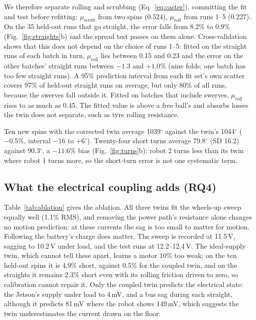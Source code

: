 \documentclass[conference,a4paper]{IEEEtran}
\begin{document}
We therefore separate rolling and scrubbing (Eq.~\ref{eq:caster}), committing
the fit and test before refitting: $\mu_\text{scrub}$ from two spins (0.524),
$\mu_\text{roll}$ from runs 1--5 (0.227). On the 35 held-out runs that go
straight, the error falls from 8.2\% to 0.9\% (Fig.~\ref{fig:straights}b) and
the spread test passes on them alone. Cross-validation shows that this does
not depend on the choice of runs 1--5: fitted on the straight runs of each
batch in turn, $\mu_\text{roll}$ lies between 0.15 and 0.23 and the error on
the other batches' straight runs between $-1.3$ and $+1.0\%$ (nine folds; one
batch has too few straight runs). A 95\% prediction interval from each fit
set's own scatter covers 97\% of held-out straight runs on average, but only
80\% of all runs, because the swerves fall outside it. Fitted on batches that
include swerves, $\mu_\text{roll}$ rises to as much as 0.45. The fitted value
is above a free ball's and absorbs losses the twin does not separate, such as
tyre rolling resistance.

Ten new spins with the corrected twin average 1039$^\circ$ against the twin's
1044$^\circ$ ($-0.5\%$, interval $-16$ to $+6^\circ$). Twenty-four short turns
average 79.8$^\circ$ (SD 16.2) against 90.3$^\circ$, a $-11.6\%$ bias
(Fig.~\ref{fig:turns}b): robot 2 turns less than its twin where robot 1 turns
more, so the short-turn error is not one systematic term.

\subsection{What the electrical coupling adds (RQ4)}
Table~\ref{tab:ablation} gives the ablation. All three twins fit the
wheels-up sweep equally well (1.1\% RMS), and removing the power path's
resistance alone changes no motion prediction: at these currents the sag is
too small to matter for motion. Following the battery's charge does matter.
The sweep is recorded at 11.5\,V, sagging to 10.2\,V under load, and the test
runs at 12.2--12.4\,V. The ideal-supply twin, which cannot tell these apart,
learns a motor 10\% too weak; on the ten held-out spins it is 4.9\% short,
against 0.5\% for the coupled twin, and on the straights it remains 2.3\% short
even with its rolling friction driven to zero, so calibration cannot repair
it. Only the coupled twin predicts the electrical state: the Jetson's supply
under load to 4\,mV, and a bus sag during each straight, although it predicts
81\,mV where the robot shows 149\,mV, which suggests the twin underestimates
the current drawn on the floor.
\end{document}
